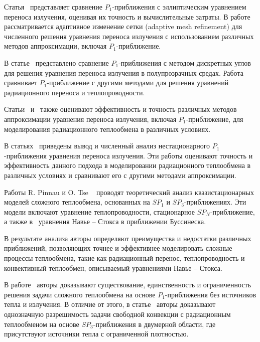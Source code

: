     Статья~\cite{modest2014elliptic} представляет сравнение $P_1$-приближения
    с эллиптическим уравнением переноса излучения, оценивая их точность и вычислительные затраты.
    В работе~\cite{frank2011adaptive} рассматривается
    адаптивное изменение сетки (adaptive mesh refinement)
    для численного решения уравнения переноса излучения
    с использованием различных методов аппроксимации, включая $P_1$-приближение.

    В статье~\cite{kovtanyuk2012} представлено сравнение $P_1$-приближения с методом
    дискретных углов для решения уравнения переноса излучения в полупрозрачных средах.
    Работа~\cite{Thommes2002} сравнивает $P_1$-приближение с другими методами для решения
    уравнений радиационного переноса и теплопроводности.

    Статьи~\cite{Larsen2002} и~\cite{Frank2007} также оценивают эффективность и точность
    различных методов аппроксимации уравнения переноса излучения,
    включая $P_1$-приближение, для моделирования радиационного теплообмена в различных условиях.


    В статьях~\cite{Addam2015, olbrant2013asymptotic, frank2010optimal, frank2011adaptive, Frank2007}
    приведены вывод и численный анализ нестационарного $P_1$-приближения уравнения переноса излучения.
    Эти работы оценивают точность и эффективность данного подхода в моделировании радиационного теплообмена
    в различных условиях и сравнивают его с другими методами аппроксимации.

    Работы R. Pinnau и O. Tse ~\cite{Pinnau2007, Pinnau2013} проводят теоретический анализ квазистационарных
    моделей сложного теплообмена, основанных на $SP_1$ и $SP_3$-приближениях.
    Эти модели включают уравнение теплопроводности, стационарное $SP_N$-приближение,
    а также в~\cite{Pinnau2013} уравнения Навье – Стокса в приближении Буссинеска.

    В результате анализа авторы определяют преимущества и недостатки различных приближений,
    позволяющих точнее и эффективнее моделировать сложные процессы теплообмена, такие как радиационный перенос,
    теплопроводность и конвективный теплообмен, описываемый уравнениями Навье – Стокса.


    В работе~\cite{Pinnau2007} авторы доказывают существование, единственность и ограниченность
    решения задачи сложного теплообмена на основе $P_1$-приближения без источников тепла и излучения.
    В отличие от этого, в статье~\cite{Pinnau2013} авторы доказывают однозначную разрешимость задачи
    свободной конвекции с радиационным теплообменом на основе $SP_3$-приближения в двумерной области,
    где присутствуют источники тепла с ограниченной плотностью.

